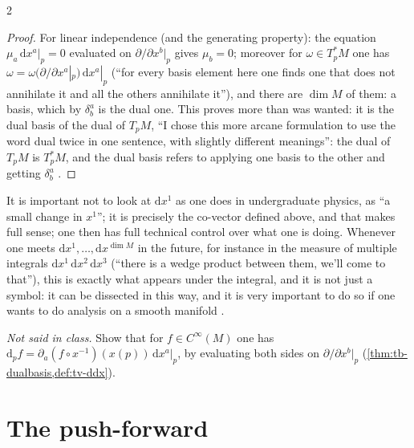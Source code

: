 \begin{paracol}{2}
\begin{proof}
For linear independence (and the generating property): the equation $\mu_a\,\mathrm dx^a|_p=0$ evaluated on $\partial/\partial x^b|_p$ gives $\mu_b=0$; moreover for $\omega\in T^*_pM$ one has $\omega=\omega(\partial/\partial x^a|_p)\,\mathrm dx^a|_p$ (``for every basis element here one finds one that does not annihilate it and all the others annihilate it''),
and there are $\dim M$ of them: a basis, which by $\delta^a_b$ is the dual one. This proves more than was wanted: it is the dual basis of the dual of $T_pM$, ``I chose this more arcane formulation to use the word dual twice in one sentence, with slightly different meanings'': the dual of $T_pM$ is $T^*_pM$, and the dual basis refers to
applying one basis to the other and getting $\delta^a_b$     .
\end{proof}
\begin{intuition}\label{int:tb-dx}
It is important not to look at $\mathrm dx^1$ as one does in undergraduate physics, as ``a small change in $x^1$''; it is precisely the co-vector defined above, and that makes full sense; one then has full technical control over what one is doing. Whenever one meets $\mathrm dx^1,\dots,\mathrm dx^{\dim M}$ in the future, for instance in the measure of multiple integrals $\mathrm dx^1\,\mathrm dx^2\,\mathrm dx^3$
(``there is a wedge product between them, we'll come to that''), this is exactly what appears under the integral, and it is not just a symbol: it can be dissected in this way, and it is very important to do so if one wants to do analysis on a smooth manifold     .
\end{intuition}
\begin{exercise}\label{ex:tb-df}
\emph{Not said in class.} Show that for $f\in C^\infty(M)$ one has $\mathrm d_pf=\partial_a(f\circ x^{-1})(x(p))\,\mathrm dx^a|_p$, by evaluating both sides on $\partial/\partial x^b|_p$ (\cref{thm:tb-dualbasis,def:tv-ddx}).
\end{exercise}

\section{The push-forward}\label{sec:tb-pushforward}


\end{paracol}
